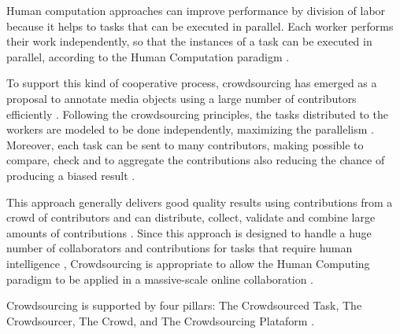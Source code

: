 Human computation approaches can improve performance by division of labor because it helps to  tasks that can be executed in parallel. Each worker performs their work independently, so that the instances of a task can be executed in parallel, according to the Human Computation paradigm \cite{Rohwer:2010:NHC:1837885.1837897}.

To support this kind of cooperative process, crowdsourcing has emerged as a proposal to annotate media objects using a large number of contributors efficiently \cite{VonAhn:2005:HC:1168246}. Following the crowdsourcing principles, the tasks distributed to the workers are modeled to be done independently, maximizing the parallelism \citep{Howe2006}. Moreover, each task can be sent to many contributors, making possible to compare, check and to aggregate the contributions also reducing the chance of producing a biased result \cite{GALTON1907}.

This approach generally delivers good quality results using contributions from a crowd of contributors and can distribute, collect, validate and combine large amounts of contributions \cite{Hong:2011:GCR:2018966.2018970,Haas:2015:AMC:2824032.2824062,Mo:2013:OPH:2505515.2505755}. Since this approach is designed to handle a huge number of collaborators and contributions for tasks that require human intelligence \cite{Howe2006}, Crowdsourcing is appropriate to allow the Human Computing paradigm to be applied in a massive-scale online collaboration \cite{TEDMassive}.

Crowdsourcing  is supported by four pillars:  The Crowdsourced Task, The Crowdsourcer, The Crowd, and The Crowdsourcing Plataform \cite{6861072}.

